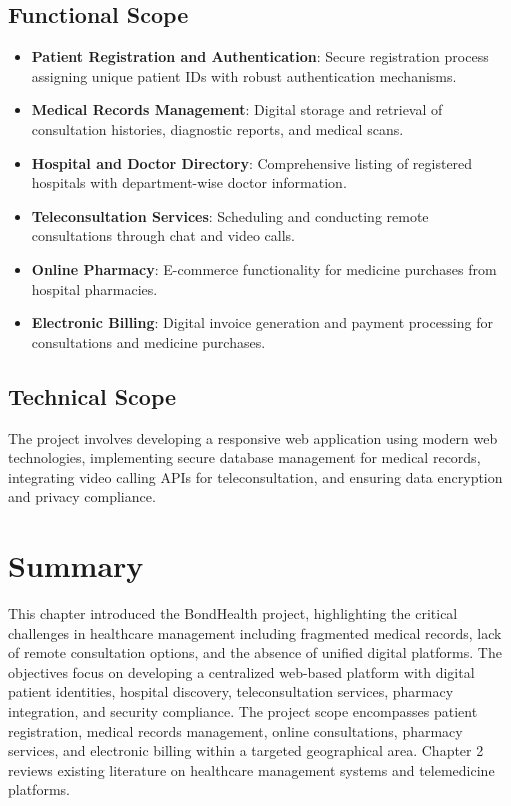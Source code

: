 \subsection{Functional Scope}
\begin{itemize}
    \item \textbf{Patient Registration and Authentication}: Secure registration process assigning unique patient IDs with robust authentication mechanisms.
    \item \textbf{Medical Records Management}: Digital storage and retrieval of consultation histories, diagnostic reports, and medical scans.
    \item \textbf{Hospital and Doctor Directory}: Comprehensive listing of registered hospitals with department-wise doctor information.
    \item \textbf{Teleconsultation Services}: Scheduling and conducting remote consultations through chat and video calls.
    \item \textbf{Online Pharmacy}: E-commerce functionality for medicine purchases from hospital pharmacies.
    \item \textbf{Electronic Billing}: Digital invoice generation and payment processing for consultations and medicine purchases.
\end{itemize}

\subsection{Technical Scope}
The project involves developing a responsive web application using modern web technologies, implementing secure database management for medical records, integrating video calling APIs for teleconsultation, and ensuring data encryption and privacy compliance.

\section{Summary}

\justifying
\noindent This chapter introduced the BondHealth project, highlighting the critical challenges in healthcare management including fragmented medical records, lack of remote consultation options, and the absence of unified digital platforms. The objectives focus on developing a centralized web-based platform with digital patient identities, hospital discovery, teleconsultation services, pharmacy integration, and security compliance. The project scope encompasses patient registration, medical records management, online consultations, pharmacy services, and electronic billing within a targeted geographical area. Chapter 2 reviews existing literature on healthcare management systems and telemedicine platforms.
